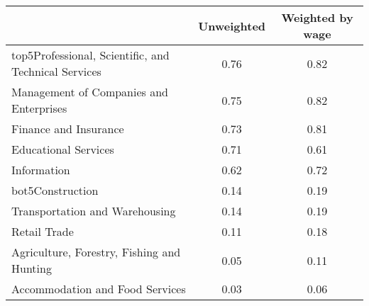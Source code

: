 \begin{tabular}{lcc} \toprule
& Unweighted & Weighted by wage\\
\midrule
top5Professional, Scientific, and Technical Services&0.76&0.82\\
Management of Companies and Enterprises&0.75&0.82\\
Finance and Insurance&0.73&0.81\\
Educational Services&0.71&0.61\\
Information&0.62&0.72\\
bot5Construction&0.14&0.19\\
Transportation and Warehousing&0.14&0.19\\
Retail Trade&0.11&0.18\\
Agriculture, Forestry, Fishing and Hunting&0.05&0.11\\
Accommodation and Food Services&0.03&0.06\\
\bottomrule \end{tabular}

